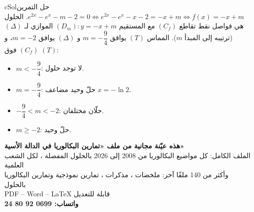 \documentclass[12pt,a4paper]{article}
\newcounter{exo}
\newenvironment{hal}{\Needspace{12\baselineskip}\begin{otherlanguage}{english}\begin{arbox}[breakable]{cSol}{حل التمرين \theexo}}{\end{arbox}\end{otherlanguage}}
\newenvironment{LTR}{\begin{otherlanguage}{english}}{\end{otherlanguage}}
\begin{document}
\begin{hal}
\pb $e^{2x}-e^{x}-m-2=0\iff e^{2x}-e^{x}-x-2=-x+m\iff f(x)=-x+m$.
الحلول هي فواصل نقط تقاطع $(C_f)$ مع المستقيم $(D_m):y=-x+m$ الموازي لـ $(\Delta)$ (ترتيبه إلى المبدأ $m$). المماس $(T)$ يوافق $m=-\dfrac94$ و $(\Delta)$ يوافق $m=-2$، و $(C_f)$ فوق $(T)$:
\begin{itemize}
\item $m<-\dfrac94$: لا توجد حلول.
\item $m=-\dfrac94$: حلّ وحيد مضاعف $x=-\ln2$.
\item $-\dfrac94<m<-2$: حلّان مختلفان.
\item $m\geq-2$: حلّ وحيد.
\end{itemize}
\end{hal}

\begin{LTR}
\begin{tcolorbox}[enhanced,colback=cSec!8,colframe=cSec,arc=3mm,halign=center,boxrule=1pt,top=10pt,bottom=10pt,before upper={\selectlanguage{arabic}}]
{\color{cSec}\Large\bfseries هذه عيّنة مجانية من ملف «تمارين البكالوريا في الدالة الأسية»}\\[6pt]
الملف الكامل: كل مواضيع البكالوريا من 2008 إلى 2026 بالحلول المفصلة ، لكل الشعب العلمية\\[4pt]
وأكثر من 140 ملفًا آخر: ملخصات ، مذكرات ، تمارين نموذجية وتمارين البكالوريا بالحلول\\[4pt]
\foreignlanguage{english}{PDF -- Word -- LaTeX} قابلة للتعديل\\[8pt]
{\color{cThm}\Large\bfseries واتساب: \foreignlanguage{english}{0699 92 80 24}}
\end{tcolorbox}
\end{LTR}
\end{document}
